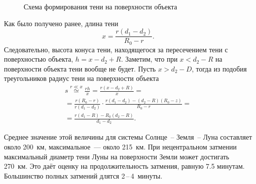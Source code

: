 \begin{figure}[h!]
    \caption{Схема формирования тени на поверхности объекта}
    \label{pic:shadow-size-on-surface}    
\end{figure}

Как было получено ранее, длина тени
\begin{equation*}
    x = \frac{r (d_1 - d_2)}{R_0 - r}.
\end{equation*}
Следовательно, высота конуса тени, находящегося за пересечением тени с поверхностью объекта, $h = x - d_2 + R$. Заметим, что при $x < d_2 - R$ на поверхности объекта тени вообще не будет. Пусть $x > d_2 - D$, тогда из подобия треугольников радиус тени на поверхности объекта
\begin{multline}
    s 
        \overset{r \ll x}{\simeq} \frac{r h}{x} 
        = \frac{r(x - d_2 + R)}{x} = \\
        = \frac{r (R_0 - r)}{r (d_1 - d_2)} \cdot \frac{r(d_1 - d_2) - (d_2 - R)(R_0 - z)}{R_0 - r} = \\
        = \frac{r (d_1 - R) - R_0 (d_2 - R)}{d_1 - d_2}.
\end{multline}

Среднее значение этой величины для системы Солнце~-- Земля~-- Луна составляет около 200~км, максимальное~--- около 215~км. При нецентральном затмении максимальный диаметр тени Луны на поверхности Земли может достигать 270~км. Это даёт оценку на продолжительность затмения, равную 7.5 минутам. Большинство полных затмений длятся 2\,--\,4~минуты.

